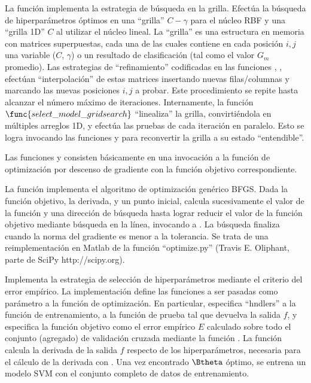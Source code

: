 La función  implementa la estrategia
de búsqueda en la grilla. Efectúa la búsqueda de hiperparámetros
óptimos en una ``grilla'' $C-\gamma$ para el núcleo RBF y una ``grilla
1D'' $C$ al utilizar el núcleo lineal.  La ``grilla'' es una
estructura en memoria con matrices superpuestas, cada una de las
cuales contiene en cada posición $i,j$ una variable ($C$, $\gamma$) o
un resultado de clasificación (tal como el valor $G_m$ promedio).  Las
estrategias de ``refinamiento'' codificadas en las funciones
, ,  efectúan
``interpolación'' de estas matrices insertando nuevas filas/columnas y
marcando las nuevas posiciones $i,j$ a probar.  Este procedimiento se
repite hasta alcanzar el número máximo de iteraciones.
Internamente, la función $\func{select\_model\_gridsearch}$
``linealiza'' la grilla, convirtiéndola en múltiples arreglos 1D, y
efectúa las pruebas de cada iteración en paralelo.  Esto se logra
invocando las funciones  y 
para reconvertir la grilla a su estado ``entendible''.

Las funciones
 y  consisten
básicamente en una invocación a la función de optimización por
descenso de gradiente  con la función objetivo
correspondiente.

La función  implementa el algoritmo de optimización
genérico BFGS.  Dada la función objetivo, la derivada, y un punto
inicial, calcula sucesivamente el valor de la función y una dirección
de búsqueda hasta lograr reducir el valor de la función objetivo
mediante búsqueda en la línea, invocando a .  La
búsqueda finaliza cuando la norma del gradiente es menor a la
tolerancia.  Se trata de una reimplementación en Matlab de la función
``optimize.py'' (Travis E. Oliphant, parte de SciPy http://scipy.org).

Implementa la estrategia de selección de hiperparámetros mediante el
criterio del error empírico.  La implementación define las funciones a
ser pasadas como parámetro a la función de optimización.  En
particular, especifica ``hndlers'' a la función de entrenamiento, a la
función de prueba tal que devuelva la salida $f$, y especifica la
función objetivo como el error empírico $E$ calculado sobre todo el
conjunto (agregado) de validación cruzada mediante la función
.
La función  calcula la derivada de la
salida $f$ respecto de los hiperparámetros, necesaria para el
cálculo de la derivada con .
Una vez encontrado $\Btheta$ óptimo, se
entrena un modelo SVM con el conjunto completo de datos de
entrenamiento.

